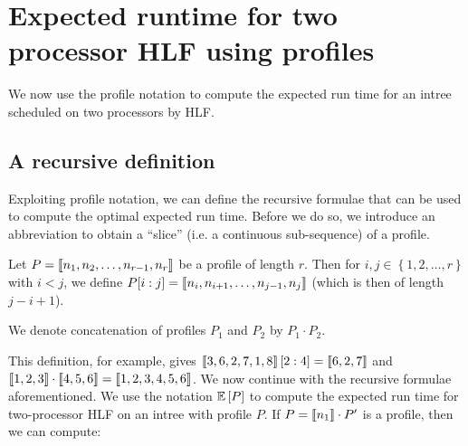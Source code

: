 \section{Expected runtime for two processor HLF using profiles}
\label{sec:p2-profiles-hlf-exp-runtime}

We now use the profile notation to compute the expected run time for an intree scheduled on two processors by HLF.

\subsection{A recursive definition}
\label{sec:p2-profile-exp-run-time-rec-def}

Exploiting profile notation, we can define the recursive formulae that can be used to compute the optimal expected run time. Before we do so, we introduce an abbreviation to obtain a ``slice'' (i.e. a continuous sub-sequence) of a profile.

\newcommand{\profileconcat}{\cdot}
\begin{definition}
  Let $P=\left\llbracket n_1,n_2,\dots,n_{r-1},n_r \right\rrbracket$ be a profile of length $r$. Then for $i,j\in\left\{ 1,2,\dots,r \right\}$ with $i<j$, we define $P[i:j]=\left\llbracket n_i,n_{i+1},\dots,n_{j-1},n_j \right\rrbracket$ (which is then of length $j-i+1$).

  We denote concatenation of profiles $P_1$ and $P_2$ by $P_1 \profileconcat P_2$.
\end{definition}

This definition, for example, gives $\left\llbracket 3,6,2,7,1,8 \right\rrbracket[2:4] = \left\llbracket 6,2,7 \right\rrbracket$ and $\profile{1,2,3}\profileconcat\profile{4,5,6}=\profile{1,2,3,4,5,6}$.
We now continue with the recursive formulae aforementioned. We use the notation $\mathbb{E}\left[ P \right]$ to compute the expected run time for two-processor HLF on an intree with profile $P$. If $P=\profile{n_1}\profileconcat P'$ is a profile, then we can compute:

